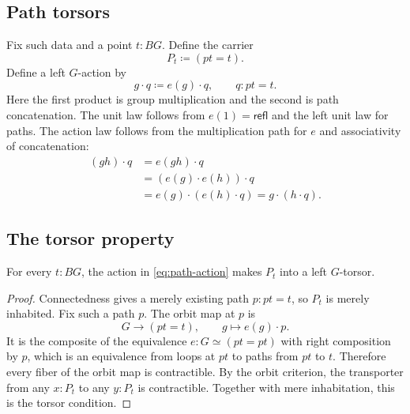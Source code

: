 \subsection{Path torsors}
Fix such data and a point $t:BG$. Define the carrier
\begin{equation}
P_t\coloneqq(pt=t).
\end{equation}
Define a left $G$-action by
\begin{equation}
g\cdot q\coloneqq e(g)\mathbin{\cdot}q, \qquad q:pt=t.
\label{eq:path-action}
\end{equation}
Here the first product is group multiplication and the second is path concatenation. The unit law follows from $e(1)=\mathsf{refl}$ and the left unit law for paths. The action law follows from the multiplication path for $e$ and associativity of concatenation:
\begin{align*}
(gh)\cdot q&=e(gh)\mathbin{\cdot}q \\\
&=(e(g)\mathbin{\cdot}e(h))\mathbin{\cdot}q \\\
&=e(g)\mathbin{\cdot}(e(h)\mathbin{\cdot}q)=g\cdot(h\cdot q).
\end{align*}


\subsection{The torsor property}
\begin{proposition}
For every $t:BG$, the action in \eqref{eq:path-action} makes $P_t$ into a left $G$-torsor.
\end{proposition}
\begin{proof}
Connectedness gives a merely existing path $p:pt=t$, so $P_t$ is merely inhabited. Fix such a path $p$. The orbit map at $p$ is
\begin{equation}
G\longrightarrow (pt=t), \qquad g\longmapsto e(g)\mathbin{\cdot}p.
\end{equation}
It is the composite of the equivalence $e:G\simeq(pt=pt)$ with right composition by $p$, which is an equivalence from loops at $pt$ to paths from $pt$ to $t$. Therefore every fiber of the orbit map is contractible. By the orbit criterion, the transporter from any $x:P_t$ to any $y:P_t$ is contractible. Together with mere inhabitation, this is the torsor condition.
\end{proof}

